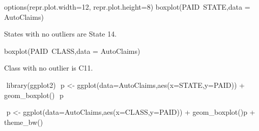 \documentclass[a4paper,12pt]{article}
\begin{document}
options(repr.plot.width=12, repr.plot.height=8)
​
boxplot(PAID~STATE,data = AutoClaims)
​

States with no outliers are State 14.

boxplot(PAID~CLASS,data = AutoClaims)
​

Class with no outlier is C11.

​
library(ggplot2)
​
p <- ggplot(data=AutoClaims,aes(x=STATE,y=PAID)) + geom_boxplot()
​
p
​

​
p <- ggplot(data=AutoClaims,aes(x=CLASS,y=PAID)) + geom_boxplot() 
​
p + theme_bw()
​
​

​
\end{document}
